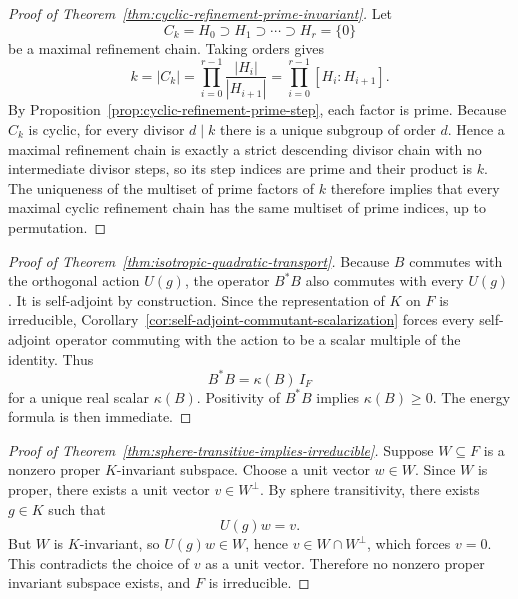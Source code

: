 \begin{proof}[Proof of Theorem~\ref{thm:cyclic-refinement-prime-invariant}]
\label{proof:thm:cyclic-refinement-prime-invariant}
Let
\[
C_k=H_0\supset H_1\supset\cdots\supset H_r=\{0\}
\]
be a maximal refinement chain. Taking orders gives
\[
k=|C_k|=\prod_{i=0}^{r-1}\frac{|H_i|}{|H_{i+1}|}
=
\prod_{i=0}^{r-1}[H_i:H_{i+1}].
\]
By Proposition~\ref{prop:cyclic-refinement-prime-step}, each factor is prime.
Because \(C_k\) is cyclic, for every divisor \(d\mid k\) there is a unique
subgroup of order \(d\). Hence a maximal refinement chain is exactly a strict
descending divisor chain with no intermediate divisor steps, so its step
indices are prime and their product is \(k\). The uniqueness of the multiset of
prime factors of \(k\) therefore implies that every maximal cyclic refinement
chain has the same multiset of prime indices, up to permutation.
\end{proof}

\begin{proof}[Proof of Theorem~\ref{thm:isotropic-quadratic-transport}]
\label{proof:thm:isotropic-quadratic-transport}
Because $B$ commutes with the orthogonal action $U(g)$, the operator $B^*B$
also commutes with every $U(g)$. It is self-adjoint by construction. Since the
representation of $K$ on $F$ is irreducible, Corollary~\ref{cor:self-adjoint-commutant-scalarization}
forces every self-adjoint operator commuting with the action to be a scalar
multiple of the identity. Thus
\[
B^*B=\kappa(B)\,I_F
\]
for a unique real scalar $\kappa(B)$. Positivity of $B^*B$ implies
$\kappa(B)\ge 0$. The energy formula is then immediate.
\end{proof}

\begin{proof}[Proof of Theorem~\ref{thm:sphere-transitive-implies-irreducible}]
\label{proof:thm:sphere-transitive-implies-irreducible}
Suppose $W\subseteq F$ is a nonzero proper $K$-invariant subspace. Choose a
unit vector $w\in W$. Since $W$ is proper, there exists a unit vector
$v\in W^{\perp}$. By sphere transitivity, there exists $g\in K$ such that
\[
U(g)w=v.
\]
But $W$ is $K$-invariant, so $U(g)w\in W$, hence $v\in W\cap W^{\perp}$, which
forces $v=0$. This contradicts the choice of $v$ as a unit vector. Therefore
no nonzero proper invariant subspace exists, and $F$ is irreducible.
\end{proof}

